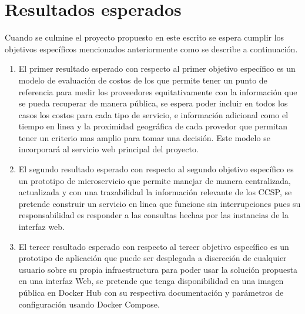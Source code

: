 \chapter{Resultados esperados} %

\label{ch:resultados} %



Cuando se culmine el proyecto propuesto en este escrito se espera cumplir los objetivos específicos mencionados anteriormente como se describe a continuación.

\begin{enumerate}
  \item El primer resultado esperado con respecto al primer objetivo específico es un modelo de evaluación de costos de los  que permite tener un punto de referencia para medir los proveedores equitativamente con la información que se pueda recuperar de manera pública, se espera poder incluir en todos los casos los costos para cada tipo de servicio, e información adicional como el tiempo en linea y la proximidad geográfica de cada provedor que permitan tener un criterio mas amplio para tomar una decisión. Este modelo se incorporará al servicio web principal del proyecto.
  
  \item El segundo resultado esperado con respecto al segundo objetivo específico es un prototipo de microservicio que permite manejar de manera centralizada, actualizada y con una trazabilidad la información relevante de los \acrshort{CCSP}, se pretende construir un servicio en linea que funcione sin interrupciones pues su responsabilidad es responder a las consultas hechas por las instancias de la interfaz web.
  
  \item El tercer resultado esperado con respecto al tercer objetivo específico es un prototipo de aplicación que puede ser desplegada a discreción de cualquier usuario sobre su propia infraestructura para poder usar la solución propuesta en una interfaz Web, se pretende que tenga disponibilidad en una imagen pública en \gls{Docker Hub} con su respectiva documentación y parámetros de configuración usando \gls{Docker Compose}.
  
\end{enumerate}


      
